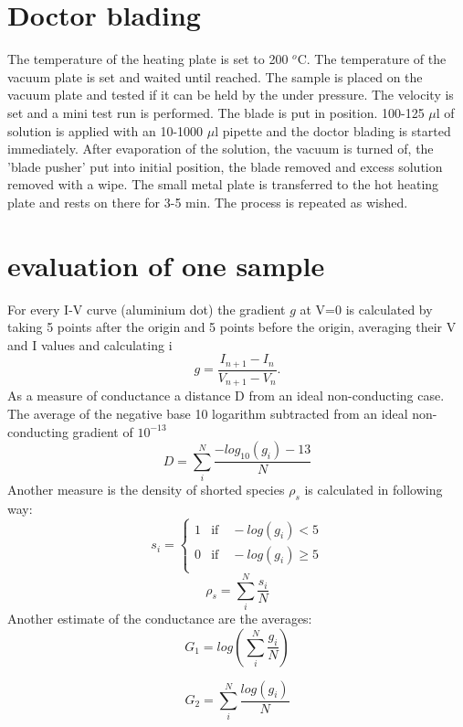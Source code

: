 \documentclass[a4paper]{article}
\begin{document}
\section{Doctor blading}
The temperature of the heating plate is set to 200 $^o$C.
The temperature of the vacuum plate is set and waited until reached.
The sample is placed on the vacuum plate and tested if it can be held by the under pressure.
The velocity is set and a mini test run is performed. 
The blade is put in position. 
100-125 $\mu$l of solution is applied with an 10-1000 $\mu$l pipette and the doctor blading is started immediately. 
After evaporation of the solution, the vacuum is turned of, the 'blade pusher' put into initial position, the blade removed and excess solution removed with a wipe. 
The small metal plate is transferred to the hot heating plate and rests on there for 3-5 min. 
The process is repeated as wished. 

\clearpage
\section{evaluation of one sample}
For every I-V curve (aluminium dot) the gradient $g$ at V=0 is calculated by taking 5 points after the origin and 5 points before the origin, averaging their V and I values and calculating i
\begin{equation}
	g = \frac{I_{n+1} - I_n}{V_{n+1} - V_n}.
\end{equation}
As a measure of conductance a distance D from an ideal non-conducting case. The average of the negative base 10 logarithm subtracted from an ideal non-conducting gradient of $10^{-13}$ 
\begin{equation}
	D = \sum_i^N \frac{ -log_{10}(g_i) - 13}{N}
\end{equation}
Another measure is the density of shorted species $\rho_{s}$ is calculated in following way:
\begin{equation}
	s_i = \begin{cases}
	1 &\text{if} \quad -log(g_i) < 5 \\
	0 &\text{if} \quad -log(g_i) \geq 5 \\
	\end{cases}
\end{equation}
\begin{equation}
	\rho_s = \sum_i^N \frac{s_i}{N}
\end{equation}
Another estimate of the conductance are the averages:
\begin{equation}
	G_1 = log \left( \sum_i^N \frac{g_i}{N} \right)
\end{equation}

\begin{equation}
	G_2 =  \sum_i^N \frac{log(g_i)}{N}
\end{equation}





\end{document}
